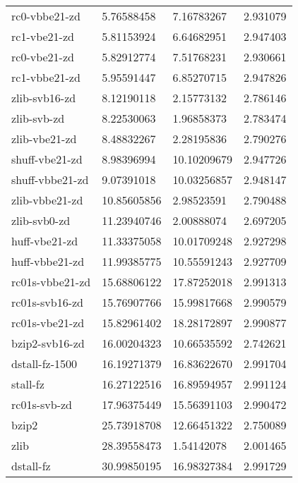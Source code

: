 \begin{table}
\begin{tabular}{|l|l|l|l|}
      rc0-vbbe21-zd     & 5.76588458      & 7.16783267    &2.931079\\
		\rowcolor{lightgray}
       rc1-vbe21-zd     & 5.81153924      & 6.64682951    &2.947403\\
		\rowcolor{lightgray}
       rc0-vbe21-zd     & 5.82912774      & 7.51768231    &2.930661\\
		\rowcolor{lightgray}
      rc1-vbbe21-zd     & 5.95591447      & 6.85270715    &2.947826\\
      zlib-svb16-zd     & 8.12190118      & 2.15773132    &2.786146\\
        zlib-svb-zd     & 8.22530063      & 1.96858373    &2.783474\\
      zlib-vbe21-zd     & 8.48832267      & 2.28195836    &2.790276\\
		\rowcolor{lightgray}
     shuff-vbe21-zd     & 8.98396994      &10.10209679    &2.947726\\
		\rowcolor{lightgray}
    shuff-vbbe21-zd     & 9.07391018      &10.03256857    &2.948147\\
     zlib-vbbe21-zd     &10.85605856      & 2.98523591    &2.790488\\
       zlib-svb0-zd     &11.23940746      & 2.00888074    &2.697205\\
      huff-vbe21-zd     &11.33375058      &10.01709248    &2.927298\\
     huff-vbbe21-zd     &11.99385775      &10.55591243    &2.927709\\
		\rowcolor{lightgray}
    rc01s-vbbe21-zd     &15.68806122      &17.87252018    &2.991313\\
		\rowcolor{lightgray}
     rc01s-svb16-zd     &15.76907766      &15.99817668    &2.990579\\
		\rowcolor{lightgray}
     rc01s-vbe21-zd     &15.82961402      &18.28172897    &2.990877\\
     bzip2-svb16-zd     &16.00204323      &10.66535592    &2.742621\\
		\rowcolor{lightgray}
     dstall-fz-1500     &16.19271379      &16.83622670    &2.991704\\
		\rowcolor{lightgray}
           stall-fz     &16.27122516      &16.89594957    &2.991124\\
		\rowcolor{lightgray}
       rc01s-svb-zd     &17.96375449      &15.56391103    &2.990472\\
              bzip2     &25.73918708      &12.66451322    &2.750089\\
               zlib     &28.39558473      & 1.54142078    &2.001465\\
		\rowcolor{lightgray}
          dstall-fz     &30.99850195      &16.98327384    &2.991729\\
	\hline
    \end{tabular}
\end{table}
